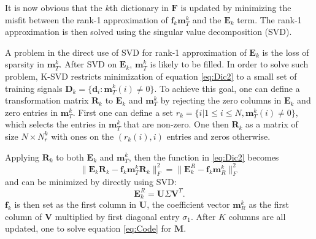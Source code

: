It is now obvious that the $k$th dictionary in $\mathbf{F}$ is updated by minimizing the misfit between the rank-1 approximation of $\mathbf{f}_k\mathbf{m}_T^k$ and the $\mathbf{E}_k$ term. The rank-1 approximation is then solved using the singular value decomposition (SVD). 

A problem in the direct use of SVD for rank-1 approximation of $\mathbf{E}_k$ is the loss of sparsity in $\mathbf{m}_T^k$. After SVD on $\mathbf{E}_k$, $\mathbf{m}_T^k$ is likely to be filled. In order to solve such problem, K-SVD restricts minimization of equation \ref{eq:Dic2} to a small set of training signals $\mathbf{D}_k=\{\mathbf{d}_i: \mathbf{m}_T^k(i)\ne 0\}$. To achieve this goal, one can define a transformation matrix $\mathbf{R}_k$ to  $\mathbf{E}_k$ and $\mathbf{m}_T^k$ by rejecting the zero columns in $\mathbf{E}_k$ and zero entries in $\mathbf{m}_T^k$. First one can define a set $r_k=\{i| 1\le i \le N, \mathbf{m}_T^k(i)\ne 0 \}$, which selects the entries in $\mathbf{m}_T^k$ that are non-zero. One then  $\mathbf{R}_k$ as a matrix of size $N\times N_r^k$ with ones on the $(r_k(i),i)$ entries and zeros otherwise.   

Applying $\mathbf{R}_k$ to both $\mathbf{E}_k$ and $\mathbf{m}_T^k$, then the  function in  \ref{eq:Dic2} becomes
\begin{equation}
\label{eq:Dic3}
\parallel\mathbf{E}_k\mathbf{R}_k- \mathbf{f}_k\mathbf{m}_T^k\mathbf{R}_k \parallel_F^2  = \parallel\mathbf{E}^R_k- \mathbf{f}_k\mathbf{m}_R^k \parallel_F^2
\end{equation}
and can be minimized by directly using SVD:
\begin{equation}
\label{eq:svd}
\mathbf{E}^R_k  = \mathbf{U}\Sigma\mathbf{V}^T. 
\end{equation}
$\mathbf{f}_k$ is then set as the first column in $\mathbf{U}$, the coefficient vector $\mathbf{m}_R^k$ as the first column of $\mathbf{V}$ multiplied by first diagonal entry $\sigma_1$. After $K$ columns are all updated, one  to solve equation \ref{eq:Code} for $\mathbf{M}$.

